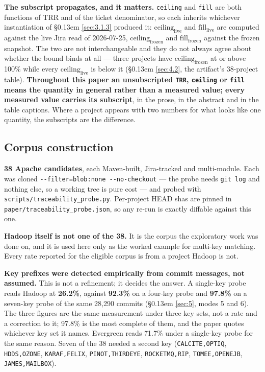 \documentclass[sigconf,review,anonymous]{acmart}
\begin{document}
\textbf{The subscript propagates, and it matters.} \texttt{ceiling} and \texttt{fill} are both functions of TRR and of the ticket denominator, so each inherits whichever instantiation of \S\kern0.13em \ref{sec:3.1.3} produced it: $\mathrm{ceiling}_\mathrm{live}$ and $\mathrm{fill}_\mathrm{live}$ are computed against the live Jira read of 2026-07-25, $\mathrm{ceiling}_\mathrm{frozen}$ and $\mathrm{fill}_\mathrm{frozen}$ against the frozen snapshot. The two are not interchangeable and they do not always agree about whether the bound binds at all --- three projects have $\mathrm{ceiling}_\mathrm{frozen}$ at or above 100\% while every $\mathrm{ceiling}_\mathrm{live}$ is below it (\S\kern0.13em \ref{sec:4.2}, the artifact's 38-project table). \textbf{Throughout this paper an unsubscripted \texttt{TRR}, \texttt{ceiling} or \texttt{fill} means the quantity in general rather than a measured value; every measured value carries its subscript}, in the prose, in the abstract and in the table captions. Where a project appears with two numbers for what looks like one quantity, the subscripts are the difference.

\subsection{Corpus construction}
\label{sec:3.2}

\textbf{38 Apache candidates}, each Maven-built, Jira-tracked and multi-module. Each was cloned \texttt{-\allowbreak{}-\allowbreak{}filter=blob:none -\allowbreak{}-\allowbreak{}no-\allowbreak{}checkout} --- the probe needs \texttt{git log} and nothing else, so a working tree is pure cost --- and probed with \texttt{scripts/\allowbreak{}traceability\_\allowbreak{}probe.\allowbreak{}py}. Per-project HEAD shas are pinned in \texttt{paper/\allowbreak{}traceability\_\allowbreak{}probe.\allowbreak{}json}, so any re-run is exactly diffable against this one.

\textbf{Hadoop itself is not one of the 38.} It is the corpus the exploratory work was done on, and it is used here only as the worked example for multi-key matching. Every rate reported for the eligible corpus is from a project Hadoop is not.

\textbf{Key prefixes were detected empirically from commit messages, not assumed.} This is not a refinement; it decides the answer. A single-key probe reads Hadoop at \textbf{26.2\%}, against \textbf{92.3\%} on a four-key probe and \textbf{97.8\%} on a seven-key probe of the same 28,290 commits (\S\kern0.13em \ref{sec:5}, modes 5 and 6). The three figures are the same measurement under three key sets, not a rate and a correction to it; 97.8\% is the most complete of them, and the paper quotes whichever key set it names. Evergreen reads 71.7\% under a single-key probe for the same reason. Seven of the 38 needed a second key (\texttt{CALCITE,OPTIQ}, \texttt{HDDS,OZONE}, \texttt{KARAF,FELIX}, \texttt{PINOT,THIRDEYE}, \texttt{ROCKETMQ,RIP}, \texttt{TOMEE,OPENEJB}, \texttt{JAMES,MAILBOX}).
\end{document}
